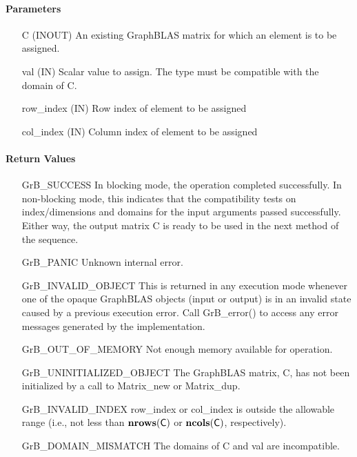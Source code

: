 \paragraph{Parameters}

\begin{itemize}[leftmargin=1.1in]
    \item[{\sf C}]   ({\sf INOUT}) An existing GraphBLAS matrix for which an 
    element is to be assigned.

    \item[{\sf val}]   ({\sf IN})  Scalar value to assign.  The type must
    be compatible with the domain of {\sf C}.
    
    \item[{\sf row\_index}] ({\sf IN}) Row index of element to be assigned
    \item[{\sf col\_index}] ({\sf IN}) Column index of element to be assigned
\end{itemize}

\paragraph{Return Values}

\begin{itemize}[leftmargin=2.1in]
    \item[{\sf GrB\_SUCCESS}]         In blocking mode, the operation completed
    successfully. In non-blocking mode, this indicates that the compatibility 
    tests on index/dimensions and domains for the input arguments passed successfully. 
    Either way, the output matrix {\sf C} is ready to be used in the next method of 
    the sequence.

    \item[{\sf GrB\_PANIC}]   Unknown internal error.
    
    \item[{\sf GrB\_INVALID\_OBJECT}] This is returned in any execution mode 
    whenever one of the opaque GraphBLAS objects (input or output) is in an invalid 
    state caused by a previous execution error.  Call {\sf GrB\_error()} to access 
    any error messages generated by the implementation.

    \item[{\sf GrB\_OUT\_OF\_MEMORY}]  Not enough memory available for operation.
    
    \item[{\sf GrB\_UNINITIALIZED\_OBJECT}]  The GraphBLAS matrix, {\sf C}, has 
    not been initialized by a call to {\sf Matrix\_new} or {\sf Matrix\_dup}.

    \item[{\sf GrB\_INVALID\_INDEX}]  {\sf row\_index} or {\sf col\_index} is 
    outside the allowable range (i.e., not less than $\mathbf{nrows}({\sf C})$ or
    $\mathbf{ncols}({\sf C})$, respectively).

    \item[{\sf GrB\_DOMAIN\_MISMATCH}]     The domains of {\sf C} and {\sf val}
    are incompatible.
\end{itemize}

